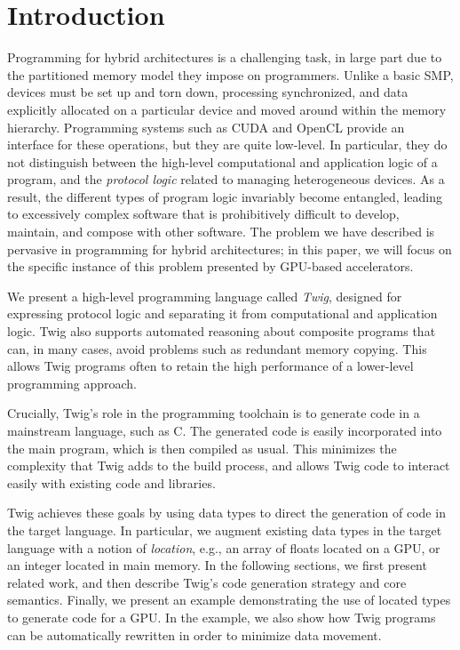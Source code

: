 
\section{Introduction}

Programming for hybrid architectures is a challenging task, in large part due to the partitioned memory model they impose on programmers. Unlike a basic SMP, devices must be set up and torn down, processing synchronized, and data explicitly allocated on a particular device and moved around within the memory hierarchy. Programming systems such as CUDA\cite{cuda} and OpenCL\cite{opencl} provide an interface for these operations, but they are quite low-level. In particular, they do not distinguish between the high-level computational and application logic of a program, and the \emph{protocol logic} related to managing heterogeneous devices. As a result, the different types of program logic invariably become entangled, leading to excessively complex software that is prohibitively difficult to develop, maintain, and compose with other software. The problem we have described is pervasive in programming for hybrid architectures; in this paper, we will focus on the specific instance of this problem presented by GPU-based accelerators.

We present a high-level programming language called \emph{Twig}, designed for expressing protocol logic and separating it from computational and application logic. Twig also  supports automated reasoning about composite programs that can, in many cases, avoid problems such as redundant memory copying. This allows Twig programs often to retain the high performance of a lower-level programming approach.

Crucially, Twig's role in the programming toolchain is to generate code in a mainstream language, such as C. The generated code is easily incorporated into the main program, which is then compiled as usual. This minimizes the complexity that Twig adds to the build process, and allows Twig code to interact easily with existing code and libraries.

Twig achieves these goals by using data types to direct the generation of code in the target language. In particular, we augment existing data types in the target language with a notion of \emph{location}, e.g., an array of floats located on a GPU, or an integer located in main memory. In the following sections, we first present related work, and then describe Twig's code generation strategy and core semantics. Finally, we present an example demonstrating the use of located types to generate code for a GPU. In the example, we also show how Twig programs can be automatically rewritten in order to minimize data movement.
